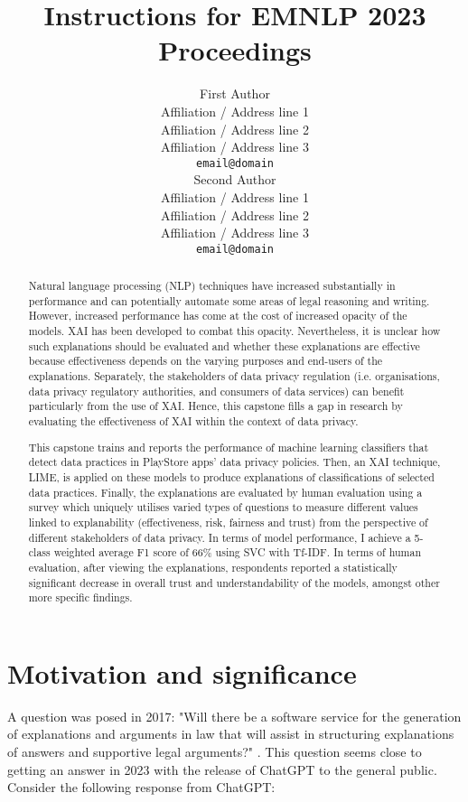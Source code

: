 \documentclass[11pt]{article}
\title{Instructions for EMNLP 2023 Proceedings}
\author{First Author \\
  Affiliation / Address line 1 \\
  Affiliation / Address line 2 \\
  Affiliation / Address line 3 \\
  \texttt{email@domain} \\\And
  Second Author \\
  Affiliation / Address line 1 \\
  Affiliation / Address line 2 \\
  Affiliation / Address line 3 \\
  \texttt{email@domain} \\}
\begin{document}
\maketitle
\begin{abstract}
Natural language processing (NLP) techniques have increased substantially in performance and can potentially automate some areas of legal reasoning and writing. However, increased performance has come at the cost of increased opacity of the models. XAI has been developed to combat this opacity. Nevertheless, it is unclear how such explanations should be evaluated and whether these explanations are effective because effectiveness depends on the varying purposes and end-users of the explanations. Separately, the stakeholders of data privacy regulation (i.e. organisations, data privacy regulatory authorities, and consumers of data services) can benefit particularly from the use of XAI. Hence, this capstone fills a gap in research by evaluating the effectiveness of XAI within the context of data privacy.

This capstone trains and reports the performance of machine learning classifiers that detect data practices in PlayStore apps' data privacy policies. Then, an XAI technique, LIME, is applied on these models to produce explanations of classifications of selected data practices. Finally, the explanations are evaluated by human evaluation using a survey which uniquely utilises varied types of questions to measure different values linked to explanability (effectiveness, risk, fairness and trust) from the perspective of different stakeholders of data privacy. In terms of model performance, I achieve a 5-class weighted average F1 score of 66\% using SVC with Tf-IDF. In terms of human evaluation, after viewing the explanations, respondents reported a statistically significant decrease in overall trust and understandability of the models, amongst other more specific findings.
\end{abstract}

\section{Motivation and significance}
A question was posed in 2017: "Will there be a software service for the generation of explanations and arguments in law that will assist in structuring explanations of answers and supportive legal arguments?" \cite{ashley_2017}. This question seems close to getting an answer in 2023 with the release of ChatGPT \cite{openai} to the general public. Consider the following response from ChatGPT:  
\end{document}
